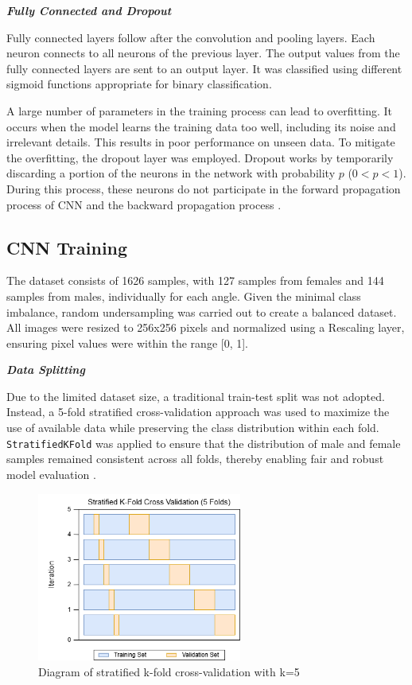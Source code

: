 \textbf{\textit{Fully Connected and Dropout}}

Fully connected layers follow after the convolution and pooling layers. Each neuron connects to all neurons of the previous layer. The output values from the fully connected layers are sent to an output layer. It was classified using different sigmoid functions appropriate for binary classification.

A large number of parameters in the training process can lead to overfitting. It occurs when the model learns the training data too well, including its noise and irrelevant details. This results in poor performance on unseen data. To mitigate the overfitting, the dropout layer was employed. Dropout works by temporarily discarding a portion of the neurons in the network with probability \( p \) (\( 0 < p < 1 \)). During this process, these neurons do not participate in the forward propagation process of CNN and the backward propagation process \cite{cui2020}.

\subsection{CNN Training}
The dataset consists of 1626 samples, with 127 samples from females and 144 samples from males, individually for each angle. Given the minimal class imbalance, random undersampling was carried out to create a balanced dataset. All images were resized to 256x256 pixels and normalized using a Rescaling layer, ensuring pixel values were within the range [0, 1].

\textbf{\textit{Data Splitting}}

Due to the limited dataset size, a traditional train-test split was not adopted. Instead, a 5-fold stratified cross-validation approach was used to maximize the use of available data while preserving the class distribution within each fold. \texttt{StratifiedKFold} was applied to ensure that the distribution of male and female samples remained consistent across all folds, thereby enabling fair and robust model evaluation \cite{stratifiedKFold2020}.

\begin{figure}[h]
	\centering
	\includegraphics[width=0.6\textwidth]{figures/skf.png}
	\caption{Diagram of stratified k-fold cross-validation with k=5}
\end{figure}

